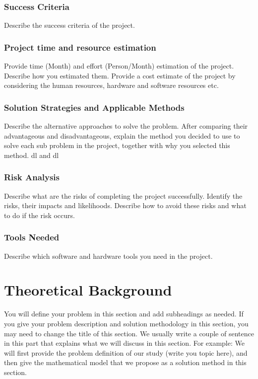 \documentclass{mefsdp}
\begin{document}
	\subsubsection{Success Criteria}
	Describe the success criteria of the project. 
	
	\subsubsection{Project time and resource estimation}
	Provide time (Month) and effort (Person/Month) estimation of the project. Describe how you estimated them. Provide a cost estimate of the project by considering the human resources, hardware and software resources etc.
	
	\subsubsection{Solution Strategies and Applicable Methods}
	Describe the alternative approaches to solve the problem. After comparing their advantageous and disadvantageous, explain the method you decided to use to solve each sub problem in the project, together with why you selected this method. \gls{dl} and \gls{dl}
	
	\subsubsection{Risk Analysis}
	Describe what are the risks of completing the project successfully. Identify the risks, their impacts and likelihoods. Describe how to avoid these risks and what to do if the risk occurs. \cite{duan2017question}
	
	\subsubsection{Tools Needed}
	Describe which software and hardware tools you need in the project.
	\cite{rothstein2017color}
	
	
	\section{Theoretical Background}
	You will define your problem in this section and add subheadings as needed. If you give your problem description and solution methodology in this section, you may need to change the title of this section. We usually write a couple of sentence in this part that explains what we will discuss in this section. For example: We will first provide the problem definition of our study (write you topic here), and then give the mathematical model that we propose as a solution method in this section.
	
\end{document}

